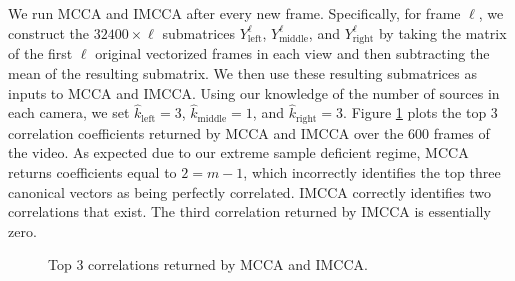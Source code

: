 We run MCCA and IMCCA after every new frame. Specifically, for frame $\ell$, we construct
the $32400\times \ell$ submatrices $Y_{\text{left}}^{\ell}$, $Y_{\text{middle}}^{\ell}$,
and $Y_{\text{right}}^{\ell}$ by taking the matrix of the first $\ell$ original vectorized
frames in each view and then subtracting the mean of the resulting submatrix. We then use
these resulting submatrices as inputs to MCCA and IMCCA. Using our knowledge of the number
of sources in each camera, we set $\widehat{k}_{\text{left}}=3$,
$\widehat{k}_{\text{middle}}=1$, and $\widehat{k}_{\text{right}}=3$. Figure
\ref{fig:chpt10:mcca_corrs} plots the top 3 correlation coefficients returned by MCCA and
IMCCA over the 600 frames of the video. As expected due to our extreme sample deficient
regime, MCCA returns coefficients equal to $2=m-1$, which incorrectly identifies the top
three canonical vectors as being perfectly correlated. IMCCA correctly identifies two
correlations that exist. The third correlation returned by IMCCA is essentially zero.

\begin{figure}
  \begin{center}
    \caption{Top 3 correlations returned by MCCA and IMCCA.}
    \label{fig:chpt10:mcca_corrs}
  \end{center}
\end{figure}

